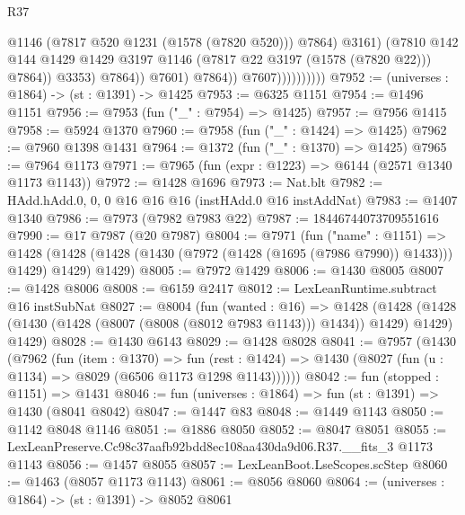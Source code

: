 \begin{lexlean}{R37}
\begin{coremodule}
                                          @1146
                                          (@7817 @520 @1231 (@1578 (@7820 @520)))
                                          @7864)
                                        @3161)
                                      (@7810
                                        @142
                                        @144
                                        @1429
                                        @1429
                                        @3197
                                        @1146
                                        (@7817 @22 @3197 (@1578 (@7820 @22)))
                                        @7864))
                                    @3353)
                                  @7864))
                              @7601)
                            @7864))
                        @7607))))))))))
@7952 := (universes : @1864) -> (st : @1391) -> @1425
@7953 := @6325 @1151
@7954 := @1496 @1151
@7956 := @7953 (fun ("_" : @7954) => @1425)
@7957 := @7956 @1415
@7958 := @5924 @1370
@7960 := @7958 (fun ("_" : @1424) => @1425)
@7962 := @7960 @1398 @1431
@7964 := @1372 (fun ("_" : @1370) => @1425)
@7965 := @7964 @1173
@7971 := @7965 (fun (expr : @1223) => @6144 (@2571 @1340 @1173 @1143))
@7972 := @1428 @1696
@7973 := Nat.blt
@7982 := HAdd.hAdd.{0, 0, 0} @16 @16 @16 (instHAdd.{0} @16 instAddNat)
@7983 := @1407 @1340
@7986 := @7973 (@7982 @7983 @22)
@7987 := 18446744073709551616
@7990 := @17 @7987 (@20 @7987)
@8004 := @7971
    (fun ("name" : @1151) =>
    @1428 (@1428 (@1428 (@1430 (@7972 (@1428 (@1695 (@7986 @7990)) @1433))) @1429) @1429) @1429)
@8005 := @7972 @1429
@8006 := @1430 @8005
@8007 := @1428 @8006
@8008 := @6159 @2417
@8012 := LexLeanRuntime.subtract @16 instSubNat
@8027 := @8004
    (fun (wanted : @16) =>
    @1428
      (@1428 (@1428 (@1430 (@1428 (@8007 (@8008 (@8012 @7983 @1143))) @1434)) @1429) @1429)
      @1429)
@8028 := @1430 @6143
@8029 := @1428 @8028
@8041 := @7957
    (@1430
      (@7962
        (fun (item : @1370) =>
        fun (rest : @1424) => @1430 (@8027 (fun (u : @1134) => @8029 (@6506 @1173 @1298 @1143))))))
@8042 := fun (stopped : @1151) => @1431
@8046 := fun (universes : @1864) => fun (st : @1391) => @1430 (@8041 @8042)
@8047 := @1447 @83
@8048 := @1449 @1143
@8050 := @1142 @8048 @1146
@8051 := @1886 @8050
@8052 := @8047 @8051
@8055 := LexLeanPreserve.Cc98c37aafb92bdd8ec108aa430da9d06.R37.__fits_3 @1173 @1143
@8056 := @1457 @8055
@8057 := LexLeanBoot.LseScopes.scStep
@8060 := @1463 (@8057 @1173 @1143)
@8061 := @8056 @8060
@8064 := (universes : @1864) -> (st : @1391) -> @8052 @8061

\end{coremodule}
\end{lexlean}
